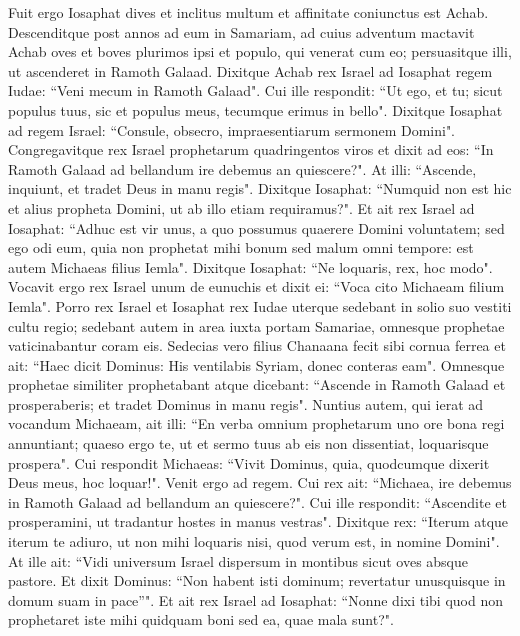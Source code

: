\begin{biblechapter}  
\verse Fuit ergo Iosaphat dives et inclitus multum et affinitate coniunctus est Achab. 
\verse Descenditque post annos ad eum in Samariam, ad cuius adventum mactavit Achab oves et boves plurimos ipsi et populo, qui venerat cum eo; persuasitque illi, ut ascenderet in Ramoth Galaad. 
\verse Dixitque Achab rex Israel ad Iosaphat regem Iudae: “Veni mecum in Ramoth Galaad". Cui ille respondit: “Ut ego, et tu; sicut populus tuus, sic et populus meus, tecumque erimus in bello". 
\verse Dixitque Iosaphat ad regem Israel: “Consule, obsecro, impraesentiarum sermonem Domini". 
\verse Congregavitque rex Israel prophetarum quadringentos viros et dixit ad eos: “In Ramoth Galaad ad bellandum ire debemus an quiescere?". At illi: “Ascende, inquiunt, et tradet Deus in manu regis". 
\verse Dixitque Iosaphat: “Numquid non est hic et alius propheta Domini, ut ab illo etiam requiramus?". 
\verse Et ait rex Israel ad Iosaphat: “Adhuc est vir unus, a quo possumus quaerere Domini voluntatem; sed ego odi eum, quia non prophetat mihi bonum sed malum omni tempore: est autem Michaeas filius Iemla". Dixitque Iosaphat: “Ne loquaris, rex, hoc modo". 
\verse Vocavit ergo rex Israel unum de eunuchis et dixit ei: “Voca cito Michaeam filium Iemla". 
\verse Porro rex Israel et Iosaphat rex Iudae uterque sedebant in solio suo vestiti cultu regio; sedebant autem in area iuxta portam Samariae, omnesque prophetae vaticinabantur coram eis. 
\verse Sedecias vero filius Chanaana fecit sibi cornua ferrea et ait: “Haec dicit Dominus: His ventilabis Syriam, donec conteras eam". 
\verse Omnesque prophetae similiter prophetabant atque dicebant: “Ascende in Ramoth Galaad et prosperaberis; et tradet Dominus in manu regis". 
\verse Nuntius autem, qui ierat ad vocandum Michaeam, ait illi: “En verba omnium prophetarum uno ore bona regi annuntiant; quaeso ergo te, ut et sermo tuus ab eis non dissentiat, loquarisque prospera". 
\verse Cui respondit Michaeas: “Vivit Dominus, quia, quodcumque dixerit Deus meus, hoc loquar!". 
\verse Venit ergo ad regem. Cui rex ait: “Michaea, ire debemus in Ramoth Galaad ad bellandum an quiescere?". Cui ille respondit: “Ascendite et prosperamini, ut tradantur hostes in manus vestras". 
\verse Dixitque rex: “Iterum atque iterum te adiuro, ut non mihi loquaris nisi, quod verum est, in nomine Domini". 
\verse At ille ait: “Vidi universum Israel dispersum in montibus sicut oves absque pastore. Et dixit Dominus: “Non habent isti dominum; revertatur unusquisque in domum suam in pace”". 
\verse Et ait rex Israel ad Iosaphat: “Nonne dixi tibi quod non prophetaret iste mihi quidquam boni sed ea, quae mala sunt?". 

\end{biblechapter}
